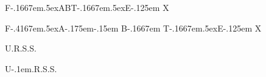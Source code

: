 F\kern-.1667em\lower.5ex\hbox{A}BT\kern-.1667em\lower.5ex\hbox{E}\kern-.125em X

F\kern-.4167em\lower.5ex\hbox{A}\kern-.175em\kern-.15em B\kern-.1667em T\kern-.1667em\lower.5ex\hbox{E}\kern-.125em X

U.R.S.S.

U\kern-.1em.R.S.S.

\bye

